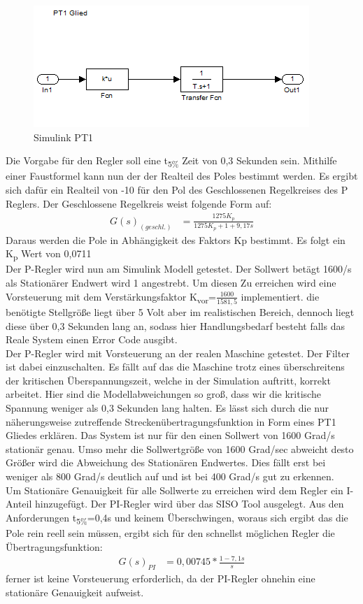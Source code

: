 \documentclass[10pt]{scrartcl}
\begin{document}
\begin{figure}
  \includegraphics[scale=0.51]{Leon-PRT-Bilder/Drehzahl5cklein}
  \caption{Simulink PT1}
\end{figure}
Die Vorgabe für den Regler soll eine t\textsubscript{5\%} Zeit von 0,3 Sekunden sein. Mithilfe einer Faustformel kann nun der der Realteil des Poles bestimmt werden. Es ergibt sich dafür ein Realteil von -10 für den Pol des Geschlossenen Regelkreises des P Reglers. Der Geschlossene Regelkreis weist folgende Form auf: 
\begin{align}
G(s)_{(geschl.)}&=\frac{1275K_p}{1275K_p+ 1+9,17s}
\end{align}
Daraus werden die Pole in Abhängigkeit des Faktors Kp bestimmt. Es folgt ein K\textsubscript{p} Wert von 0,0711 \\
Der P-Regler wird nun am Simulink Modell getestet. Der Sollwert betägt 1600\textdegree/s  als Stationärer Endwert wird 1 angestrebt. Um diesen Zu erreichen wird eine Vorsteuerung mit dem Verstärkungsfaktor  K\textsubscript{vor}=$\frac{1600}{1581,5}$ implementiert.
 die benötigte Stellgröße liegt über 5 Volt aber im realistischen Bereich, dennoch liegt diese über 0,3 Sekunden lang an, sodass hier Handlungsbedarf besteht falls das Reale System einen Error Code ausgibt.\\
Der P-Regler wird mit Vorsteuerung an der realen Maschine getestet. Der Filter ist dabei einzuschalten. Es fällt auf das die Maschine trotz eines überschreitens der kritischen Überspannungszeit, welche in der Simulation auftritt, korrekt arbeitet. Hier sind die Modellabweichungen so groß, dass wir die kritische Spannung weniger als 0,3 Sekunden  lang halten. Es lässt sich durch die nur näherungsweise zutreffende Streckenübertragungsfunktion in Form eines PT1 Gliedes erklären. Das System ist nur für den einen Sollwert von 1600 Grad/s stationär genau. Umso mehr die Sollwertgröße von 1600 Grad/sec abweicht desto Größer wird die Abweichung des Stationären Endwertes. Dies fällt erst bei weniger als 800 Grad/s deutlich auf und ist bei 400 Grad/s gut zu erkennen.\\
Um Stationäre Genauigkeit für alle Sollwerte zu erreichen wird dem Regler ein I-Anteil hinzugefügt. Der PI-Regler wird über das SISO Tool ausgelegt. Aus den Anforderungen t\textsubscript{5\%}=0,4s und keinem Überschwingen, woraus sich ergibt das die Pole rein reell sein müssen, ergibt sich für den schnellst möglichen Regler die Übertragungsfunktion:
\begin{align}
G(s)_{PI}&=0,00745*\frac{1-7,1s}{s}
\end{align}
 ferner ist keine Vorsteuerung erforderlich, da der PI-Regler ohnehin eine stationäre Genauigkeit aufweist. \\
\end{document}
